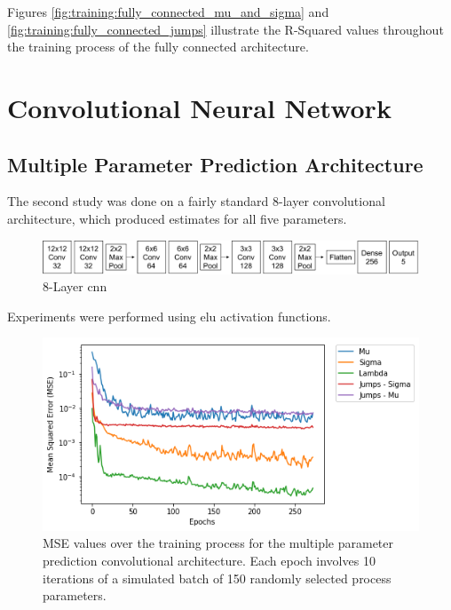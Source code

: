 \documentclass[11pt,oneside,openany,a4paper,english, report, goldenblock
]{usthesis}
\begin{document}
Figures \ref{fig:training:fully_connected_mu_and_sigma} and \ref{fig:training:fully_connected_jumps} illustrate the R-Squared values throughout the training process of the fully connected architecture.

\section{Convolutional Neural Network}

\subsection{Multiple Parameter Prediction Architecture}
\label{chap:ConvolutionalNeuralNetwork-section:MultipleParameterPredictionArchitecture}
The second study was done on a fairly standard 8-layer convolutional architecture, which produced estimates for all five parameters.

\begin{figure}[h]
	\centering
	\includegraphics[width=1\linewidth]{Images/Diagrams/Network-Structures/MultipleOutputCNN}
	\caption[Multiple Output Prediction \acrshort{cnn}]{8-Layer \acrshort{cnn}}
	\label{fig:multipleoutputcnn}
\end{figure}

Experiments were performed using \acrshort{elu} activation functions. 

\begin{figure}[h]
	\centering
	\includegraphics[width=0.7\linewidth]{Images/Results/Training/COVNET_MO_MSE}
	\caption[MSE values over the training process for the 8-Layer \acrshort{cnn}]{MSE values over the training process for the multiple parameter prediction convolutional architecture. Each epoch involves 10 iterations of a simulated batch of 150 randomly selected process parameters.}
	\label{fig:covnetmomse}
\end{figure}
\end{document}
